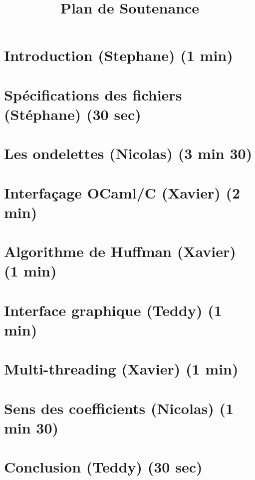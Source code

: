\documentclass[a4paper,12pt]{article}
\begin{document}
\title{Plan de Soutenance}
\maketitle
\section{Introduction (Stephane) (1 min)}
\section{Spécifications des fichiers (Stéphane) (30 sec)}
\section{Les ondelettes (Nicolas) (3 min 30)}
\section{Interfaçage OCaml/C (Xavier) (2 min)}
\section{Algorithme de Huffman (Xavier) (1 min)}
\section{Interface graphique (Teddy) (1 min)}
\section{Multi-threading (Xavier) (1 min)}
\section{Sens des coefficients (Nicolas) (1 min 30)}
\section{Conclusion (Teddy) (30 sec)}
\end{document}
